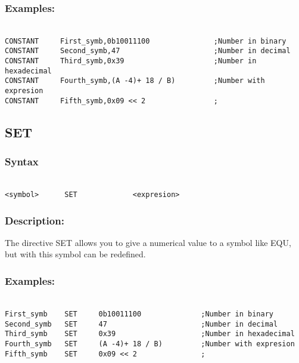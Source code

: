         \subsubsection{Examples:}
        {
            ~\\
            \usecodefont
            \verb'CONSTANT     First_symb,0b10011100               ;Number in binary'\\
            \verb'CONSTANT     Second_symb,47                      ;Number in decimal'\\
            \verb'CONSTANT     Third_symb,0x39                     ;Number in hexadecimal'\\
            \verb'CONSTANT     Fourth_symb,(A -4)+ 18 / B)         ;Number with expresion'\\
            \verb'CONSTANT     Fifth_symb,0x09 << 2                ;'\\
        }

    \subsection{SET}
        \subsubsection{Syntax}
        {
            ~\\
            \usecodefont
            \verb'<symbol>      SET             <expresion>'
        }
        \subsubsection{Description:}
            The directive SET allows you to give a numerical value to a symbol like EQU, but with this symbol can be redefined.

        \subsubsection{Examples:}
        {
            ~\\
            \usecodefont
            \verb'First_symb    SET     0b10011100              ;Number in binary'\\
            \verb'Second_symb   SET     47                      ;Number in decimal'\\
            \verb'Third_symb    SET     0x39                    ;Number in hexadecimal'\\
            \verb'Fourth_symb   SET     (A -4)+ 18 / B)         ;Number with expresion'\\
            \verb'Fifth_symb    SET     0x09 << 2               ;'\\
        }
        
